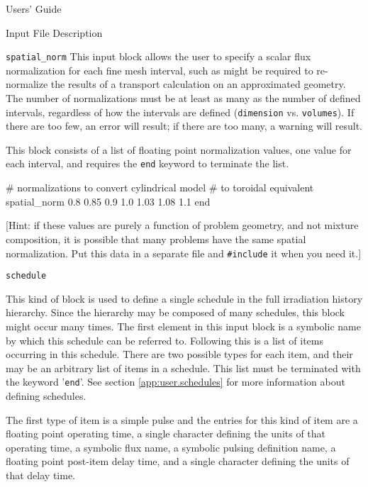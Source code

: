 \begin{chapter}{Users' Guide\label{app:user.guide}}
\begin{section}{Input File Description\label{app:user.input}}
\begin{subsection}{\texttt{spatial\_norm}\label{app:user.input.norm}}
      This input block allows the user to specify a scalar flux
      normalization for each fine mesh interval, such as might be
      required to re-normalize the results of a transport calculation
      on an approximated geometry.  The number of normalizations must
      be at least as many as the number of defined intervals,
      regardless of how the intervals are defined (\texttt{dimension}
      vs. \texttt{volumes}).  If there are too few, an error will
      result; if there are too many, a warning will result.
      
      This block consists of a list of floating point normalization
      values, one value for each interval, and requires the
      \texttt{end} keyword to terminate the list.

      \begin{center}
        \renewcommand{\baselinestretch}{1}\normalsize
        \begin{boxedverbatim}
# normalizations to convert cylindrical model
# to toroidal equivalent
spatial_norm
   0.8
   0.85
   0.9
   1.0
   1.03
   1.08
   1.1
end
\end{boxedverbatim}
      \end{center}

      [Hint: if these values are purely a function of problem
      geometry, and not mixture composition, it is possible that many
      problems have the same spatial normalization.  Put this data in
      a separate file and \texttt{\#include} it when you need it.]
      
    \end{subsection}
   
    \begin{subsection}{\texttt{schedule}\label{app:user.input.sched}}
      
      This kind of block is used to define a single schedule in the
      full irradiation history hierarchy.  Since the hierarchy may be
      composed of many schedules, this block might occur many times.
      The first element in this input block is a symbolic name by
      which this schedule can be referred to.  Following this is a list
      of items occurring in this schedule.  There are two possible
      types for each item, and their may be an arbitrary list of items
      in a schedule.  This list must be terminated with the keyword
      '\texttt{end}'.  See section \ref{app:user.schedules} for more
      information about defining schedules.
      
      The first type of item is a simple pulse and the entries for
      this kind of item are a floating point operating time, a single
      character defining the units of that operating time, a symbolic
      flux name, a symbolic pulsing definition name, a floating point
      post-item delay time, and a single character defining the units
      of that delay time.
      

\end{subsection}
\end{section}
\end{chapter}
